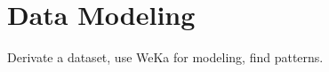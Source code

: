 \section{Data Modeling}
	\label{sec:datamodeling}
	Derivate a dataset, use WeKa for modeling, find patterns.
